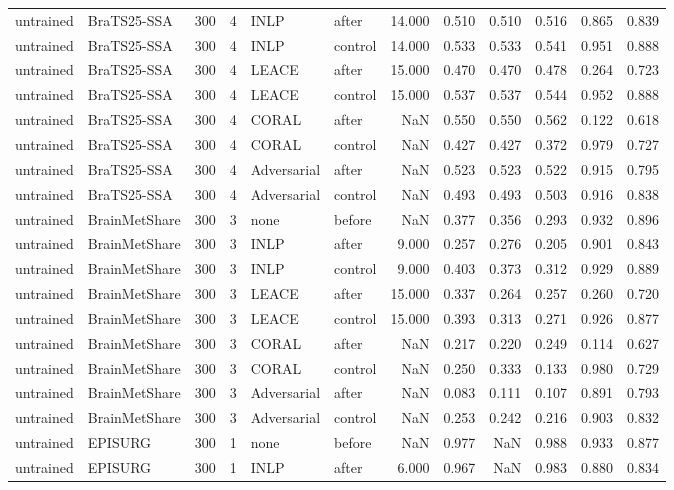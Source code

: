 \begin{tabular}{llrrllrrrrrr}
untrained & BraTS25-SSA & 300 & 4 & INLP & after & 14.000 & 0.510 & 0.510 & 0.516 & 0.865 & 0.839 \\
untrained & BraTS25-SSA & 300 & 4 & INLP & control & 14.000 & 0.533 & 0.533 & 0.541 & 0.951 & 0.888 \\
untrained & BraTS25-SSA & 300 & 4 & LEACE & after & 15.000 & 0.470 & 0.470 & 0.478 & 0.264 & 0.723 \\
untrained & BraTS25-SSA & 300 & 4 & LEACE & control & 15.000 & 0.537 & 0.537 & 0.544 & 0.952 & 0.888 \\
untrained & BraTS25-SSA & 300 & 4 & CORAL & after & NaN & 0.550 & 0.550 & 0.562 & 0.122 & 0.618 \\
untrained & BraTS25-SSA & 300 & 4 & CORAL & control & NaN & 0.427 & 0.427 & 0.372 & 0.979 & 0.727 \\
untrained & BraTS25-SSA & 300 & 4 & Adversarial & after & NaN & 0.523 & 0.523 & 0.522 & 0.915 & 0.795 \\
untrained & BraTS25-SSA & 300 & 4 & Adversarial & control & NaN & 0.493 & 0.493 & 0.503 & 0.916 & 0.838 \\
untrained & BrainMetShare & 300 & 3 & none & before & NaN & 0.377 & 0.356 & 0.293 & 0.932 & 0.896 \\
untrained & BrainMetShare & 300 & 3 & INLP & after & 9.000 & 0.257 & 0.276 & 0.205 & 0.901 & 0.843 \\
untrained & BrainMetShare & 300 & 3 & INLP & control & 9.000 & 0.403 & 0.373 & 0.312 & 0.929 & 0.889 \\
untrained & BrainMetShare & 300 & 3 & LEACE & after & 15.000 & 0.337 & 0.264 & 0.257 & 0.260 & 0.720 \\
untrained & BrainMetShare & 300 & 3 & LEACE & control & 15.000 & 0.393 & 0.313 & 0.271 & 0.926 & 0.877 \\
untrained & BrainMetShare & 300 & 3 & CORAL & after & NaN & 0.217 & 0.220 & 0.249 & 0.114 & 0.627 \\
untrained & BrainMetShare & 300 & 3 & CORAL & control & NaN & 0.250 & 0.333 & 0.133 & 0.980 & 0.729 \\
untrained & BrainMetShare & 300 & 3 & Adversarial & after & NaN & 0.083 & 0.111 & 0.107 & 0.891 & 0.793 \\
untrained & BrainMetShare & 300 & 3 & Adversarial & control & NaN & 0.253 & 0.242 & 0.216 & 0.903 & 0.832 \\
untrained & EPISURG & 300 & 1 & none & before & NaN & 0.977 & NaN & 0.988 & 0.933 & 0.877 \\
untrained & EPISURG & 300 & 1 & INLP & after & 6.000 & 0.967 & NaN & 0.983 & 0.880 & 0.834 \\

\end{tabular}
